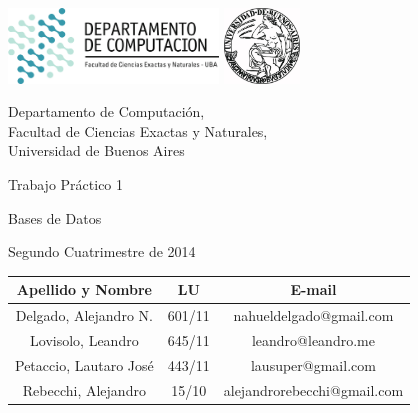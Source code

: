 \documentclass[a4paper, 10pt, twoside]{article}
\newcommand{\titulo}{Trabajo Práctico 1}
\newcommand{\materia}{Bases de Datos}
\newcommand{\cuatrimestre}{Segundo Cuatrimestre de 2014}
\begin{document}


\thispagestyle{caratula}

\begin{center}

\includegraphics[height=2cm]{DC.png} 
\hfill
\includegraphics[height=2cm]{UBA.jpg} 

\vspace{2cm}

Departamento de Computación,\\
Facultad de Ciencias Exactas y Naturales,\\
Universidad de Buenos Aires

\vspace{4cm}

\begin{Huge}
\titulo
\end{Huge}

\vspace{0.5cm}

\begin{Large}
\materia
\end{Large}

\vspace{1cm}

\cuatrimestre

\vspace{4cm}

\begin{tabular}{|c|c|c|}
\hline
Apellido y Nombre & LU & E-mail\\
\hline
Delgado, Alejandro N.  & 601/11 & nahueldelgado@gmail.com\\
Lovisolo, Leandro      & 645/11 & leandro@leandro.me\\
Petaccio, Lautaro José & 443/11 & lausuper@gmail.com\\
Rebecchi, Alejandro & 15/10 & alejandrorebecchi@gmail.com\\
\hline
\end{tabular}

\end{center}
\end{document}
